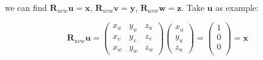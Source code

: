 \documentclass[10pt, a4paper]{article}
\begin{document}
                \indent we can find $\textbf{R}_{uvw}\textbf{u} = \textbf{x}$, $\textbf{R}_{uvw}\textbf{v} = \textbf{y}$, $\textbf{R}_{uvw}\textbf{w} = \textbf{z}$. Take $\textbf{u}$ as example:
                
                \begin{equation*}
                    \textbf{R}_{uvw}\textbf{u}=\begin{pmatrix}
                        x_u&y_u&z_u\\
                        x_v&y_v&z_v\\
                        x_w&y_w&z_w
                    \end{pmatrix}
                    \begin{pmatrix}
                        x_u\\
                        y_u\\
                        z_u
                    \end{pmatrix}
                    =
                    \begin{pmatrix}
                        1\\
                        0\\
                        0\\
                    \end{pmatrix}
                    =\textbf{x}
                \end{equation*}
\end{document}
